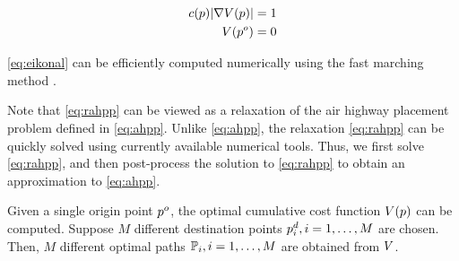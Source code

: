 \begin{equation}
\label{eq:eikonal}
\begin{aligned}
c(p)|\nabla V(p)| &= 1 \\
V(p^o) &= 0
\end{aligned}
\end{equation}

\eqref{eq:eikonal} can be efficiently computed numerically using the fast marching method \cite{}.

Note that \eqref{eq:rahpp} can be viewed as a relaxation of the air highway placement problem defined in \eqref{eq:ahpp}. Unlike \eqref{eq:ahpp}, the relaxation \eqref{eq:rahpp} can be quickly solved using currently available numerical tools. Thus, we first solve \eqref{eq:rahpp}, and then post-process the solution to \eqref{eq:rahpp} to obtain an approximation to \eqref{eq:ahpp}.

Given a single origin point $p^o$, the optimal cumulative cost function $V(p)$ can be computed. Suppose $M$ different destination points $p^d_i,i=1,\ldots,M$ are chosen. Then, $M$ different optimal paths $\mathbb{P}_i,i=1,\ldots,M$ are obtained from $V$.